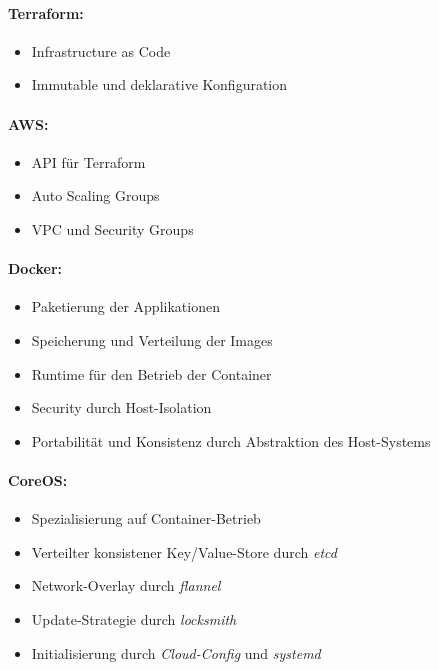 \paragraph{Terraform:}
\begin{itemize}
  \item Infrastructure as Code
  \item Immutable und deklarative Konfiguration
\end{itemize}

\paragraph{AWS:}
\begin{itemize}
  \item API f\"ur Terraform
  \item Auto Scaling Groups
  \item VPC und Security Groups
\end{itemize}

\paragraph{Docker:}
\begin{itemize}
  \item Paketierung der Applikationen
  \item Speicherung und Verteilung der Images
  \item Runtime f\"ur den Betrieb der Container
  \item Security durch Host-Isolation
  \item Portabilit\"at und Konsistenz durch Abstraktion des Host-Systems
\end{itemize}

\paragraph{CoreOS:}
\begin{itemize}
  \item Spezialisierung auf Container-Betrieb
  \item Verteilter konsistener Key/Value-Store durch \emph{etcd}
  \item Network-Overlay durch \emph{flannel}
  \item Update-Strategie durch \emph{locksmith}
  \item Initialisierung durch \emph{Cloud-Config} und \emph{systemd}
\end{itemize}

